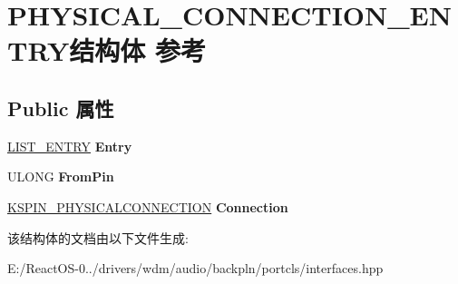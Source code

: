 \hypertarget{struct_p_h_y_s_i_c_a_l___c_o_n_n_e_c_t_i_o_n___e_n_t_r_y}{}\section{P\+H\+Y\+S\+I\+C\+A\+L\+\_\+\+C\+O\+N\+N\+E\+C\+T\+I\+O\+N\+\_\+\+E\+N\+T\+R\+Y结构体 参考}
\label{struct_p_h_y_s_i_c_a_l___c_o_n_n_e_c_t_i_o_n___e_n_t_r_y}
\subsection*{Public 属性}
\begin{DoxyCompactItemize}
\item 
\mbox{\label{struct_p_h_y_s_i_c_a_l___c_o_n_n_e_c_t_i_o_n___e_n_t_r_y_a1c8ca3a37a6332d01a99dfdcd4387b61}} 
\hyperlink{struct___l_i_s_t___e_n_t_r_y}{L\+I\+S\+T\+\_\+\+E\+N\+T\+RY} {\bfseries Entry}
\item 
\mbox{\label{struct_p_h_y_s_i_c_a_l___c_o_n_n_e_c_t_i_o_n___e_n_t_r_y_aa1cdb3272dc4284d221b327cc0cfb356}} 
U\+L\+O\+NG {\bfseries From\+Pin}
\item 
\mbox{\label{struct_p_h_y_s_i_c_a_l___c_o_n_n_e_c_t_i_o_n___e_n_t_r_y_a09e55ecdc6ce35eedd6b51f75e249f15}} 
\hyperlink{struct_k_s_p_i_n___p_h_y_s_i_c_a_l_c_o_n_n_e_c_t_i_o_n}{K\+S\+P\+I\+N\+\_\+\+P\+H\+Y\+S\+I\+C\+A\+L\+C\+O\+N\+N\+E\+C\+T\+I\+ON} {\bfseries Connection}
\end{DoxyCompactItemize}


该结构体的文档由以下文件生成\+:\begin{DoxyCompactItemize}
\item 
E\+:/\+React\+O\+S-\/0../drivers/wdm/audio/backpln/portcls/interfaces.\+hpp\end{DoxyCompactItemize}
